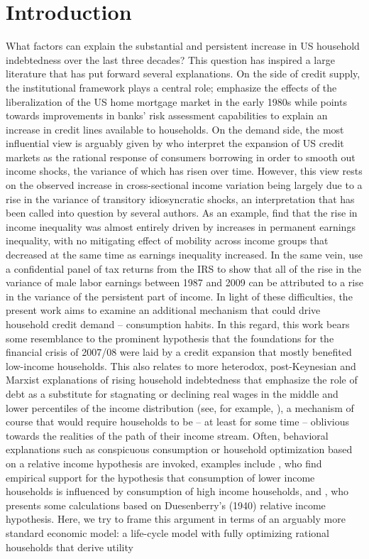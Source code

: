\section{Introduction}\label{sec:intro}
What factors can explain the substantial and persistent increase in US household indebtedness over the last three decades? This question has inspired a large literature that has put forward several explanations. On the side of credit supply, the institutional framework plays a central role; \citet{CampbellHercovitz2005} emphasize the effects of the liberalization of the US home mortgage market in the early 1980s while \citet{Narajabad2012} points towards improvements in banks' risk assessment capabilities to explain an increase in credit lines available to households. On the demand side, the most influential view is arguably given by \citet{KruegerPerri2006} who interpret the expansion of US credit markets as the rational response of consumers borrowing in order to smooth out income shocks, the variance of which has risen over time. However, this view rests on the observed increase in cross-sectional income variation being largely due to a rise in the variance of transitory idiosyncratic shocks, an interpretation that has been called into question by several authors. As an example, \citet{KopczukSaezSong2010} find that the rise in income inequality was almost entirely driven by increases in permanent earnings inequality, with no mitigating effect of mobility across income groups that decreased at the same time as earnings inequality increased. In the same vein, \citet{DHPRV2013} use a confidential panel of tax returns from the IRS to show that all of the rise in the variance of male labor earnings between 1987 and 2009 can be attributed to a rise in the variance of the persistent part of income. In light of these difficulties, the present work aims to examine an additional mechanism that could drive household credit demand -- consumption habits. In this regard, this work bears some resemblance to the prominent \citet{Rajan2011} hypothesis that the foundations for the financial crisis of 2007/08 were laid by a credit expansion that mostly benefited low-income households. This also relates to more heterodox, post-Keynesian and Marxist explanations of rising household indebtedness that emphasize the role of debt as a substitute for stagnating or declining real wages in the middle and lower percentiles of the income distribution (see, for example, \citealp{BarbaPivetti2009}), a mechanism of course that would require households to be -- at least for some time -- oblivious towards the realities of the path of their income stream. Often, behavioral explanations such as conspicuous consumption or household optimization based on a relative income hypothesis are invoked, examples include \citet{BertrandMorse2012}, who find empirical support for the hypothesis that consumption of lower income households is influenced by consumption of high income households, and \citet{vanTreeck2012}, who presents some calculations based on Duesenberry's (1940) relative income hypothesis. Here, we try to frame this argument in terms of an arguably more standard economic model: a life-cycle model with fully optimizing rational households that derive utility 